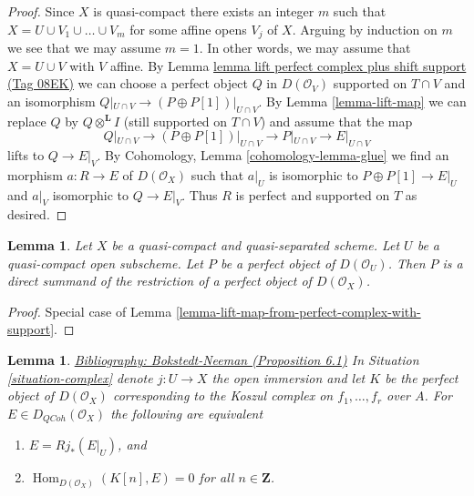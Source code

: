 \documentclass{amsart}
\newenvironment{reference}{\comment}{\endcomment}
\theoremstyle{plain}
\newtheorem{lemma}[subsection]{Lemma}
\theoremstyle{definition}
\theoremstyle{remark}
\numberwithin{equation}{subsection}
\def\Hom{\mathop{\mathrm{Hom}}\nolimits}
\def\QCoh{\mathit{QCoh}}
\begin{document}
\begin{proof}
Since $X$ is quasi-compact there exists an integer $m$ such that
$X = U \cup V_1 \cup \ldots \cup V_m$ for some affine opens $V_j$ of $X$.
Arguing by induction on $m$ we see that we may assume $m = 1$. In other
words, we may assume that $X = U \cup V$ with $V$ affine. By
Lemma \href{https://stacks.math.columbia.edu/tag/08EK}{lemma lift perfect complex plus shift support (Tag 08EK)}
we can choose a perfect object $Q$ in $D(\mathcal{O}_V)$
supported on $T \cap V$ and an isomorphism
$Q|_{U \cap V} \to (P \oplus P[1])|_{U \cap V}$.
By Lemma \ref{lemma-lift-map} we can replace $Q$ by
$Q \otimes^\mathbf{L} I$ (still supported on $T \cap V$)
and assume that the map
$$
Q|_{U \cap V} \to (P \oplus P[1])|_{U \cap V}
\longrightarrow P|_{U \cap V}
\longrightarrow
E|_{U \cap V}
$$
lifts to $Q \to E|_V$. By
Cohomology, Lemma \ref{cohomology-lemma-glue}
we find an morphism $a : R \to E$ of $D(\mathcal{O}_X)$
such that $a|_U$ is isomorphic to $P \oplus P[1] \to E|_U$
and $a|_V$ isomorphic to $Q \to E|_V$.
Thus $R$ is perfect and supported on $T$ as desired.
\end{proof}


\begin{lemma}
\label{lemma-direct-summand-of-a-restriction}
Let $X$ be a quasi-compact and quasi-separated scheme.
Let $U$ be a quasi-compact open subscheme.
Let $P$ be a perfect object of $D(\mathcal{O}_U)$.
Then $P$ is a direct summand of the restriction of a perfect
object of $D(\mathcal{O}_X)$.
\end{lemma}

\begin{proof}
Special case of Lemma \ref{lemma-lift-map-from-perfect-complex-with-support}.
\end{proof}


\begin{lemma}
\label{lemma-orthogonal-koszul-complex}
\begin{reference}
\href{https://stacks.math.columbia.edu/bibliography}{Bibliography: Bokstedt-Neeman (Proposition 6.1)}
\end{reference}
In Situation \ref{situation-complex} denote $j : U \to X$ the open
immersion and let $K$ be the perfect object of $D(\mathcal{O}_X)$
corresponding to the Koszul complex on $f_1, \ldots, f_r$ over $A$.
For $E \in D_\QCoh(\mathcal{O}_X)$ the following are equivalent
\begin{enumerate}
\item $E = Rj_*(E|_U)$, and
\item $\Hom_{D(\mathcal{O}_X)}(K[n], E) = 0$ for all $n \in \mathbf{Z}$.
\end{enumerate}
\end{lemma}
\end{document}
